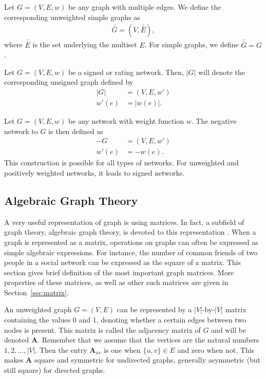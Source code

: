 \documentclass{article}
\begin{document}
Let $G=(V,E,w)$ be any graph with multiple edges.  We define the
corresponding unweighted simple graphs as
\begin{align}
  \bar{\bar{G}} = (V, \bar{\bar E}),
\end{align}
where $\bar{\bar E}$ is the set underlying the multiset $E$. For simple
graphs, we define $\bar{\bar G} = G$. 

Let $G=(V,E,w)$ be a signed or rating network.  Then, $|G|$ will denote
the corresponding unsigned graph defined by
\begin{align}
  |G| &= (V,E, w') \\
  w'(e) &= |w(e)|. \nonumber
\end{align}

Let $G=(V,E,w)$ be any network with weight function $w$.  The negative
network to $G$ is then defined as
\begin{align}
  -G &= (V, E, w') \\
  w'(e) &= -w(e). \nonumber
\end{align}
This construction is possible for all types of networks. For unweighted
and positively weighted networks, it leads to signed networks. 

\subsection{Algebraic Graph Theory}
A very useful representation of graph is using matrices. In fact, a
subfield of graph theory, algebraic graph theory, is devoted to
this representation \citep{b118}.  When a graph is represented as a
matrix, operations on graphs can often be expressed as simple algebraic
expressions.  For instance, the number of common friends of
two people in a social network can be expressed as the square of a
matrix. 
This section gives brief definition of the most important graph
matrices.  More properties of these matrices, as well as other such
matrices are given in Section~\ref{sec:matrix}. 

An unweighted graph $G=(V,E)$ can be represented by a $|V|$-by-$|V|$
matrix containing the values 0 and 1, denoting whether a certain edges
between two nodes is present.  This matrix is called the adjacency
matrix of $G$ and will be denoted $\mathbf A$.  Remember that we assume
that the vertices are the natural numbers $1, 2, \dotsc, |V|$.  Then the
entry $\mathbf A_{uv}$ is one when $\{u,v\} \in E$ and zero when not.
This makes $\mathbf A$ square and symmetric for undirected graphs, generally
asymmetric (but still square) for directed graphs.  
\end{document}
